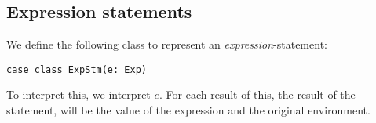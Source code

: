 \subsection{Expression statements}
We define the following class to represent an \textsl{expression}-statement:
\begin{lstlisting}[style=simple]
case class ExpStm(e: Exp)
\end{lstlisting}
To interpret this, we interpret $e$. For each result of this, the result of the statement, will be the value of the expression and the original environment. 

\fi
